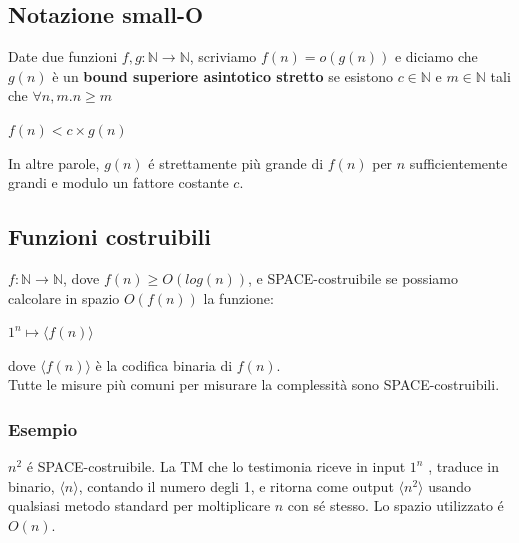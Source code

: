 \documentclass[a4paper, 12pt]{article}
\begin{document}
\subsection{Notazione small-O}
Date due funzioni $f,g: \mathbb{N} \rightarrow \mathbb{N}$, scriviamo $f(n) = o(g(n))$ e diciamo che $g(n)$ \`e un \textbf{bound superiore asintotico stretto} se esistono $c \in \mathbb{N}$ e $m \in \mathbb{N}$ tali che $\forall n,m. n \geq m$
\begin{center}
$f(n) < c \times g(n)$
\end{center}
In altre parole, $g(n)$ é strettamente più grande di $f(n)$ per $n$ sufficientemente grandi e modulo un fattore costante $c$.
\subsection{Funzioni costruibili}
$f: \mathbb{N} \rightarrow \mathbb{N}$, dove $f(n) \geq O(log(n))$, e SPACE-costruibile se possiamo calcolare in spazio $O(f(n))$ la funzione:
\begin{center}
$ 1^{n} \longmapsto \langle f(n) \rangle$
\end{center}
dove $\langle f(n) \rangle$ \`e la codifica binaria di $f(n)$.\\
Tutte le misure più comuni per misurare la complessità sono SPACE-costruibili.
\subsubsection{Esempio}
$n^2$ é SPACE-costruibile. La TM che lo testimonia riceve in input $1^n$ , traduce in binario, $\langle n \rangle$, contando il numero degli 1, e ritorna come output $\langle n^2 \rangle$ usando qualsiasi metodo standard per moltiplicare $n$ con sé stesso. Lo spazio utilizzato é $O(n)$.
\end{document}
